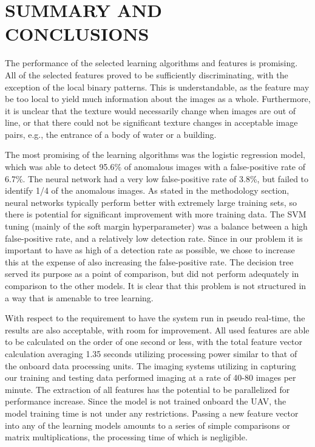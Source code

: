 


\chapter{SUMMARY AND CONCLUSIONS \label{cha:Summary}}

The performance of the selected learning algorithms and features is promising.
All of the selected features proved to be sufficiently discriminating, with the exception of the local binary patterns.
This is understandable, as the feature may be too local to yield much information about the images as a whole.
Furthermore, it is unclear that the texture would necessarily change when images are out of line, or that there could not be significant texture changes in acceptable image pairs, e.g., the entrance of a body of water or a building.

The most promising of the learning algorithms was the logistic regression model, which was able to detect 95.6\% of anomalous images with a false-positive rate of 6.7\%.
The neural network had a very low false-positive rate of 3.8\%, but failed to identify 1/4 of the anomalous images.
As stated in the methodology section, neural networks typically perform better with extremely large training sets, so there is potential for significant improvement with more training data.
The SVM tuning (mainly of the soft margin hyperparameter) was a balance between a high false-positive rate, and a relatively low detection rate.
Since in our problem it is important to have as high of a detection rate as possible, we chose to increase this at the expense of also increasing the false-positive rate.
The decision tree served its purpose as a point of comparison, but did not perform adequately in comparison to the other models.
It is clear that this problem is not structured in a way that is amenable to tree learning.

With respect to the requirement to have the system run in pseudo real-time, the results are also acceptable, with room for improvement.
All used features are able to be calculated on the order of one second or less, with the total feature vector calculation averaging 1.35 seconds utilizing processing power similar to that of the onboard data processing units.
The imaging systems utilizing in capturing our training and testing data performed imaging at a rate of 40-80 images per minute.
The extraction of all features has the potential to be parallelized for performance increase.
Since the model is not trained onboard the UAV, the model training time is not under any restrictions.
Passing a new feature vector into any of the learning models amounts to a series of simple comparisons or matrix multiplications, the processing time of which is negligible.


